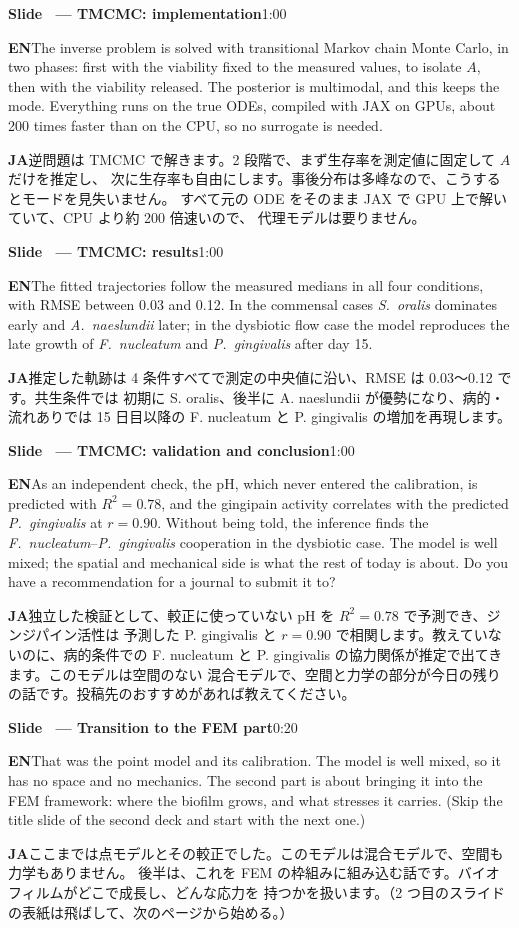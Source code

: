 \documentclass[11pt,a4paper]{article}
\newcounter{sl}
\newcommand{\slide}[2]{\stepcounter{sl}\vspace{8pt}%
  {\color{c3}\large\bfseries Slide \thesl\ --- #1}\hfill{\small #2}\par\vspace{2pt}}
\newcommand{\EN}{\textbf{EN}\quad}
\newcommand{\JA}{\par\textbf{JA}\quad}
\begin{document}
\slide{TMCMC: implementation}{1:00}
\EN The inverse problem is solved with transitional Markov chain Monte Carlo,
in two phases: first with the viability fixed to the measured values, to
isolate $A$, then with the viability released. The posterior is multimodal,
and this keeps the mode. Everything runs on the true ODEs, compiled with JAX
on GPUs, about 200 times faster than on the CPU, so no surrogate is needed.
\JA 逆問題は TMCMC で解きます。2 段階で、まず生存率を測定値に固定して $A$ だけを推定し、
次に生存率も自由にします。事後分布は多峰なので、こうするとモードを見失いません。
すべて元の ODE をそのまま JAX で GPU 上で解いていて、CPU より約 200 倍速いので、
代理モデルは要りません。

\slide{TMCMC: results}{1:00}
\EN The fitted trajectories follow the measured medians in all four
conditions, with RMSE between 0.03 and 0.12. In the commensal cases
\textit{S.~oralis} dominates early and \textit{A.~naeslundii} later; in the
dysbiotic flow case the model reproduces the late growth of
\textit{F.~nucleatum} and \textit{P.~gingivalis} after day 15.
\JA 推定した軌跡は 4 条件すべてで測定の中央値に沿い、RMSE は 0.03〜0.12 です。共生条件では
初期に S. oralis、後半に A. naeslundii が優勢になり、病的・流れありでは 15 日目以降の
F. nucleatum と P. gingivalis の増加を再現します。

\slide{TMCMC: validation and conclusion}{1:00}
\EN As an independent check, the pH, which never entered the calibration, is
predicted with $R^2=0.78$, and the gingipain activity correlates with the
predicted \textit{P.~gingivalis} at $r=0.90$. Without being told, the
inference finds the \textit{F.~nucleatum}--\textit{P.~gingivalis} cooperation
in the dysbiotic case. The model is well mixed; the spatial and mechanical
side is what the rest of today is about.
Do you have a recommendation for a journal to submit it to?
\JA 独立した検証として、較正に使っていない pH を $R^2=0.78$ で予測でき、ジンジパイン活性は
予測した P. gingivalis と $r=0.90$ で相関します。教えていないのに、病的条件での
F. nucleatum と P. gingivalis の協力関係が推定で出てきます。このモデルは空間のない
混合モデルで、空間と力学の部分が今日の残りの話です。投稿先のおすすめがあれば教えてください。

\vspace{6pt}{\large\bfseries Part 2: FEM coupling (slides\_1005)}\par

\slide{Transition to the FEM part}{0:20}
\EN That was the point model and its calibration. The model is well mixed, so
it has no space and no mechanics. The second part is about bringing it into
the FEM framework: where the biofilm grows, and what stresses it carries.
(Skip the title slide of the second deck and start with the next one.)
\JA ここまでは点モデルとその較正でした。このモデルは混合モデルで、空間も力学もありません。
後半は、これを FEM の枠組みに組み込む話です。バイオフィルムがどこで成長し、どんな応力を
持つかを扱います。（2 つ目のスライドの表紙は飛ばして、次のページから始める。）
\end{document}
